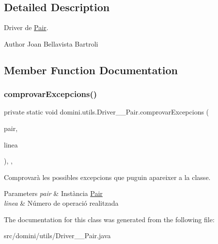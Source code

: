 \subsection{Detailed Description}
Driver de \hyperlink{classdomini_1_1utils_1_1Pair}{Pair}. 

\begin{DoxyAuthor}{Author}
Joan Bellavista Bartroli 
\end{DoxyAuthor}


\subsection{Member Function Documentation}
\mbox{\label{classdomini_1_1utils_1_1Driver____Pair_a640e07e7811e0b56a99ca1afb7e16b65}} 
\subsubsection{\texorpdfstring{comprovar\+Excepcions()}{comprovarExcepcions()}}
{\footnotesize\ttfamily private static void domini.\+utils.\+Driver\+\_\+\+\_\+\+Pair.\+comprovar\+Excepcions (\begin{DoxyParamCaption}\item[{\hyperlink{classdomini_1_1utils_1_1Pair}{Pair}$<$ Byte, Byte $>$}]{pair,  }\item[{String}]{linea }\end{DoxyParamCaption})\hspace{0.3cm}{\ttfamily [inline]}, {\ttfamily [static]}, {\ttfamily [private]}}



Comprovarà les possibles excepcions que puguin apareixer a la classe. 


\begin{DoxyParams}{Parameters}
{\em pair} & Instància \hyperlink{classdomini_1_1utils_1_1Pair}{Pair} \\
\hline
{\em linea} & Número de operació realitzada \\
\hline
\end{DoxyParams}


The documentation for this class was generated from the following file\+:\begin{DoxyCompactItemize}
\item 
src/domini/utils/Driver\+\_\+\+\_\+\+Pair.\+java\end{DoxyCompactItemize}
